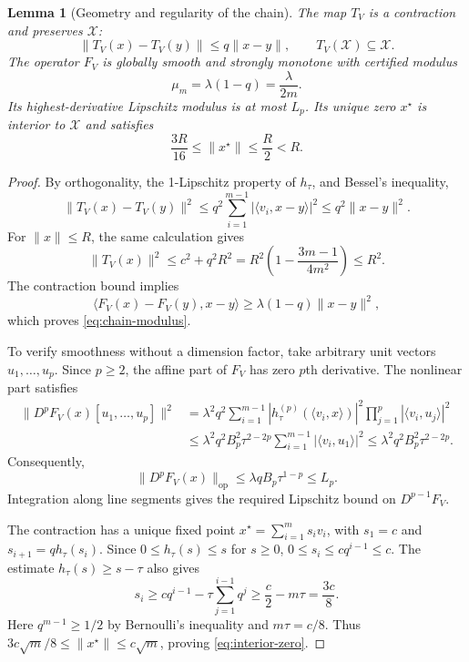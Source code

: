 \documentclass[11pt]{article}
\numberwithin{equation}{section}
\newtheorem{lemma}[theorem]{Lemma}
\theoremstyle{definition}
\theoremstyle{remark}
\begin{document}
\begin{lemma}[Geometry and regularity of the chain]\label{lem:chain-regularity}
The map $T_V$ is a contraction and preserves $\mathcal X$:
\begin{equation}\label{eq:chain-contraction}
\|T_V(x)-T_V(y)\|\le q\|x-y\|,
\qquad T_V(\mathcal X)\subseteq\mathcal X.
\end{equation}
The operator $F_V$ is globally smooth and strongly monotone with
certified modulus
\begin{equation}\label{eq:chain-modulus}
\mu_m=\lambda(1-q)=\frac{\lambda}{2m}.
\end{equation}
Its highest-derivative Lipschitz modulus is at most $L_p$.
Its unique zero $x^\star$ is interior to $\mathcal X$ and satisfies
\begin{equation}\label{eq:interior-zero}
\frac{3R}{16}\le\|x^\star\|\le\frac R2<R.
\end{equation}
\end{lemma}

\begin{proof}
By orthogonality, the 1-Lipschitz property of $h_\tau$, and Bessel's
inequality,
\[
\|T_V(x)-T_V(y)\|^2
\le q^2\sum_{i=1}^{m-1}|\langle v_i,x-y\rangle|^2
\le q^2\|x-y\|^2.
\]
For $\|x\|\le R$, the same calculation gives
\[
\|T_V(x)\|^2\le c^2+q^2R^2
=R^2\left(1-\frac{3m-1}{4m^2}\right)\le R^2.
\]
The contraction bound implies
\[
\langle F_V(x)-F_V(y),x-y\rangle
\ge\lambda(1-q)\|x-y\|^2,
\]
which proves \eqref{eq:chain-modulus}.

To verify smoothness without a dimension factor, take arbitrary unit
vectors $u_1,\ldots,u_p$. Since $p\ge2$, the affine part of $F_V$
has zero $p$th derivative. The nonlinear part satisfies
\begin{align*}
\|D^pF_V(x)[u_1,\ldots,u_p]\|^2
&=\lambda^2q^2\sum_{i=1}^{m-1}
 |h_\tau^{(p)}(\langle v_i,x\rangle)|^2
 \prod_{j=1}^p|\langle v_i,u_j\rangle|^2\\
&\le\lambda^2q^2B_p^2\tau^{2-2p}
 \sum_{i=1}^{m-1}|\langle v_i,u_1\rangle|^2
\le\lambda^2q^2B_p^2\tau^{2-2p}.
\end{align*}
Consequently,
\begin{equation}\label{eq:chain-smoothness}
\|D^pF_V(x)\|_{\mathrm{op}}
\le\lambda qB_p\tau^{1-p}\le L_p.
\end{equation}
Integration along line segments gives the required Lipschitz bound on
$D^{p-1}F_V$.

The contraction has a unique fixed point
$x^\star=\sum_{i=1}^m s_i v_i$, with
$s_1=c$ and $s_{i+1}=qh_\tau(s_i)$. Since
$0\le h_\tau(s)\le s$ for $s\ge0$,
$0\le s_i\le cq^{i-1}\le c$. The estimate
$h_\tau(s)\ge s-\tau$ also gives
\[
s_i\ge cq^{i-1}-\tau\sum_{j=1}^{i-1}q^j
\ge\frac c2-m\tau=\frac{3c}{8}.
\]
Here $q^{m-1}\ge1/2$ by Bernoulli's inequality and $m\tau=c/8$.
Thus $3c\sqrt m/8\le\|x^\star\|\le c\sqrt m$, proving
\eqref{eq:interior-zero}.
\end{proof}
\end{document}
